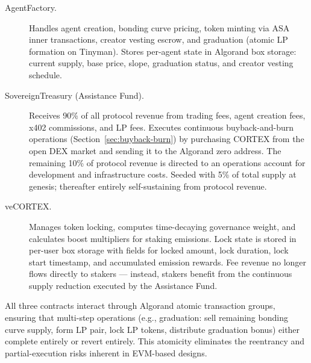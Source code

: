 \begin{description}
  \item[AgentFactory.] Handles agent creation, bonding curve pricing, token
    minting via ASA inner transactions, creator vesting escrow, and graduation
    (atomic LP formation on Tinyman). Stores per-agent state in Algorand box
    storage: current supply, base price, slope, graduation status, and creator
    vesting schedule.

  \item[SovereignTreasury (Assistance Fund).] Receives 90\% of all protocol
    revenue from trading fees, agent creation fees, x402 commissions, and LP
    fees. Executes continuous buyback-and-burn operations
    (Section~\ref{sec:buyback-burn}) by purchasing CORTEX from the open DEX
    market and sending it to the Algorand zero address. The remaining 10\% of
    protocol revenue is directed to an operations account for development and
    infrastructure costs. Seeded with 5\% of total supply at genesis;
    thereafter entirely self-sustaining from protocol revenue.

  \item[veCORTEX.] Manages token locking, computes time-decaying governance
    weight, and calculates boost multipliers for staking emissions. Lock state
    is stored in per-user box storage with fields for locked amount, lock
    duration, lock start timestamp, and accumulated emission rewards. Fee
    revenue no longer flows directly to stakers --- instead, stakers benefit
    from the continuous supply reduction executed by the Assistance Fund.
\end{description}

All three contracts interact through Algorand atomic transaction groups,
ensuring that multi-step operations (e.g., graduation: sell remaining bonding
curve supply, form LP pair, lock LP tokens, distribute graduation bonus) either
complete entirely or revert entirely. This atomicity eliminates the reentrancy
and partial-execution risks inherent in EVM-based designs.
